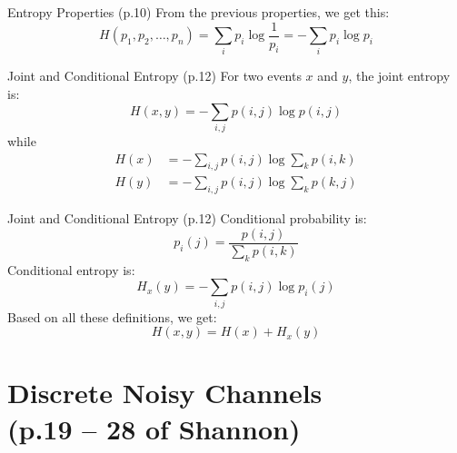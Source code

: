 \documentclass{beamer}
\begin{document}
  \begin{frame}{Entropy Properties \small (p.10)}
    From the previous properties, we get this:
    \begin{equation}
      H(p_1, p_2, \ldots, p_n) = \sum_i p_i \log \frac{1}{p_i} = -\sum_i p_i \log p_i
    \end{equation}
  \end{frame}

  \begin{frame}{Joint and Conditional Entropy \small (p.12)}
    For two events $x$ and $y$, the joint entropy is:
    \begin{equation}
      H(x, y) = -\sum_{i,j} p(i,j) \log p(i,j)
    \end{equation}
    while
    \begin{align}
      H(x) &= -\sum_{i,j} p(i,j) \log \sum_k p(i,k) \\
      H(y) &= -\sum_{i,j} p(i,j) \log \sum_k p(k,j)
    \end{align}
  \end{frame}

  \begin{frame}{Joint and Conditional Entropy \small (p.12)}
    Conditional probability is:
    \begin{equation}
      p_i(j) = \frac{p(i,j)}{\sum_k p(i,k)}
    \end{equation}
    Conditional entropy is:
    \begin{equation}
      H_x(y) = -\sum_{i,j} p(i,j) \log p_i(j)
    \end{equation}
    Based on all these definitions, we get:
    \begin{equation}
      H(x,y) = H(x) + H_x(y)
    \end{equation}
  \end{frame}

  \section{Discrete Noisy Channels \\
           \small (p.19 -- 28 of Shannon)}
\end{document}
